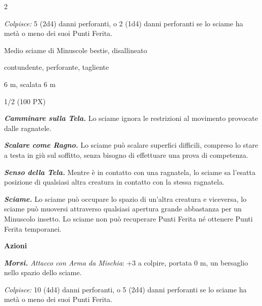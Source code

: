 \begin{multicols}{2}
{\emph{Colpisce:} 5 (2d4) danni perforanti, o 2 (1d4) danni perforanti se lo sciame ha metà o meno dei suoi Punti Ferita.

\begin{description}[noitemsep, topsep=0pt, parsep=0pt, partopsep=0pt, itemsep=1pt, leftmargin=2.35cm,  labelwidth=2.2cm, itemindent=0cm, listparindent=0pt] %
\setlength{\baselineskip}{10pt}
\item[\textbf{Taglia/Tipo}] Medio sciame di Minuscole bestie, disallineato
\item[\textbf{Caratt.}] 
\item[\textbf{Punti Ferita}] 
\item[\textbf{Resistenze al danno}] contundente, perforante, tagliente
\item[\textbf{Tiri Salvez.}] 
\item[\textbf{Movimento}] 6 m, scalata 6 m
\item[\textbf{Sfida}] 1/2 (100 PX)
\end{description}
\smallskip

\emph{\textbf{Camminare sulla Tela.}} Lo sciame ignora le restrizioni al movimento provocate dalle ragnatele.

\emph{\textbf{Scalare come Ragno.}} Lo sciame può scalare superfici difficili, compreso lo stare a testa in giù sul soffitto, senza bisogno di effettuare una prova di competenza.

\emph{\textbf{Senso della Tela.}} Mentre è in contatto con una ragnatela, lo sciame sa l'esatta posizione di qualsiasi altra creatura in contatto con la stessa ragnatela.

\emph{\textbf{Sciame.}} Lo sciame può occupare lo spazio di un'altra creatura e viceversa, lo sciame può muoversi attraverso qualsiasi apertura grande abbastanza per un Minuscolo insetto. Lo sciame non può recuperare Punti Ferita né ottenere Punti Ferita temporanei.

\textbf{Azioni}

\emph{\textbf{Morsi.} Attacco con Arma da Mischia}: +3 a colpire, portata 0 m, un bersaglio nello spazio dello sciame.

\emph{Colpisce:} 10 (4d4) danni perforanti, o 5 (2d4) danni perforanti se lo sciame ha metà o meno dei suoi Punti Ferita.

}
\end{multicols}
